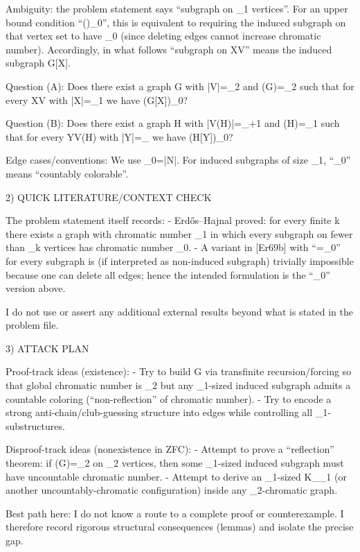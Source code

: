 Ambiguity: the problem statement says “subgraph on \aleph_1 vertices”.
For an upper bound condition “\chi(\cdot)\le\aleph_0”, this is equivalent to requiring the induced subgraph on that vertex set to have \chi\le\aleph_0 (since deleting edges cannot increase chromatic number).
Accordingly, in what follows “subgraph on X\subseteq V” means the induced subgraph G[X].

Question (A): Does there exist a graph G with |V|=\aleph_2 and \chi(G)=\aleph_2 such that for every X\subseteq V with |X|=\aleph_1 we have \chi(G[X])\le \aleph_0?

Question (B): Does there exist a graph H with |V(H)|=\aleph_{\omega+1} and \chi(H)=\aleph_1 such that for every Y\subseteq V(H) with |Y|=\aleph_{\omega} we have \chi(H[Y])\le \aleph_0?

Edge cases/conventions: We use \aleph_0=|\mathbb N|. For induced subgraphs of size \aleph_1, “\chi\le \aleph_0” means “countably colorable”.


2) QUICK LITERATURE/CONTEXT CHECK

The problem statement itself records:
- Erd\H{o}s–Hajnal proved: for every finite k there exists a graph with chromatic number \aleph_1 in which every subgraph on fewer than \aleph_k vertices has chromatic number \le \aleph_0.
- A variant in [Er69b] with “=\aleph_0” for every subgraph is (if interpreted as non-induced subgraph) trivially impossible because one can delete all edges; hence the intended formulation is the “\le\aleph_0” version above.

I do not use or assert any additional external results beyond what is stated in the problem file.


3) ATTACK PLAN

Proof-track ideas (existence):
- Try to build G via transfinite recursion/forcing so that global chromatic number is \aleph_2 but any \aleph_1-sized induced subgraph admits a countable coloring (“non-reflection” of chromatic number).
- Try to encode a strong anti-chain/club-guessing structure into edges while controlling all \aleph_1-substructures.

Disproof-track ideas (nonexistence in ZFC):
- Attempt to prove a “reflection” theorem: if \chi(G)=\aleph_2 on \aleph_2 vertices, then some \aleph_1-sized induced subgraph must have uncountable chromatic number.
- Attempt to derive an \aleph_1-sized K_{\aleph_1} (or another uncountably-chromatic configuration) inside any \aleph_2-chromatic graph.

Best path here: I do not know a route to a complete proof or counterexample. I therefore record rigorous structural consequences (lemmas) and isolate the precise gap.


